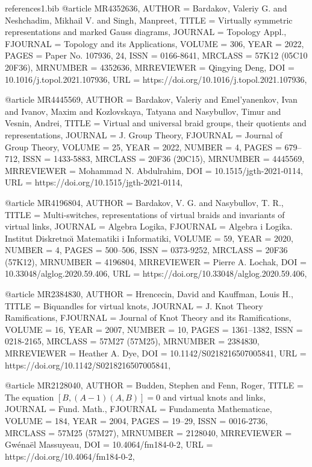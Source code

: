 \documentclass[11pt, reqno]{amsart}
\theoremstyle{definition}
\begin{document}
\begin{filecontents*}[overwrite]{references1.bib}
@article {MR4352636,
 AUTHOR = {Bardakov, Valeriy G. and Neshchadim, Mikhail V. and Singh,
  Manpreet},
 TITLE = {Virtually symmetric representations and marked {G}auss
  diagrams},
 JOURNAL = {Topology Appl.},
 FJOURNAL = {Topology and its Applications},
 VOLUME = {306},
 YEAR = {2022},
 PAGES = {Paper No. 107936, 24},
 ISSN = {0166-8641},
 MRCLASS = {57K12 (05C10 20F36)},
 MRNUMBER = {4352636},
 MRREVIEWER = {Qingying Deng},
 DOI = {10.1016/j.topol.2021.107936},
 URL = {https://doi.org/10.1016/j.topol.2021.107936},
}

@article {MR4445569,
 AUTHOR = {Bardakov, Valeriy and Emel'yanenkov, Ivan and Ivanov, Maxim
  and Kozlovskaya, Tatyana and Nasybullov, Timur and Vesnin,
  Andrei},
 TITLE = {Virtual and universal braid groups, their quotients and
  representations},
 JOURNAL = {J. Group Theory},
 FJOURNAL = {Journal of Group Theory},
 VOLUME = {25},
 YEAR = {2022},
 NUMBER = {4},
 PAGES = {679--712},
 ISSN = {1433-5883},
 MRCLASS = {20F36 (20C15)},
 MRNUMBER = {4445569},
 MRREVIEWER = {Mohammad N. Abdulrahim},
 DOI = {10.1515/jgth-2021-0114},
 URL = {https://doi.org/10.1515/jgth-2021-0114},
}

@article {MR4196804,
 AUTHOR = {Bardakov, V. G. and Nasybullov, T. R.},
 TITLE = {Multi-switches, representations of virtual braids and
  invariants of virtual links},
 JOURNAL = {Algebra Logika},
 FJOURNAL = {Algebra i Logika. Institut Diskretno\u{\i} Matematiki i
  Informatiki},
 VOLUME = {59},
 YEAR = {2020},
 NUMBER = {4},
 PAGES = {500--506},
 ISSN = {0373-9252},
 MRCLASS = {20F36 (57K12)},
 MRNUMBER = {4196804},
 MRREVIEWER = {Pierre A. Lochak},
 DOI = {10.33048/alglog.2020.59.406},
 URL = {https://doi.org/10.33048/alglog.2020.59.406},
}

@article {MR2384830,
    AUTHOR = {Hrencecin, David and Kauffman, Louis H.},
     TITLE = {Biquandles for virtual knots},
   JOURNAL = {J. Knot Theory Ramifications},
  FJOURNAL = {Journal of Knot Theory and its Ramifications},
    VOLUME = {16},
      YEAR = {2007},
    NUMBER = {10},
     PAGES = {1361--1382},
      ISSN = {0218-2165},
   MRCLASS = {57M27 (57M25)},
  MRNUMBER = {2384830},
MRREVIEWER = {Heather A. Dye},
       DOI = {10.1142/S0218216507005841},
       URL = {https://doi.org/10.1142/S0218216507005841},
}

@article {MR2128040,
 AUTHOR = {Budden, Stephen and Fenn, Roger},
 TITLE = {The equation {$[B,(A-1)(A,B)]=0$} and virtual knots and links},
 JOURNAL = {Fund. Math.},
 FJOURNAL = {Fundamenta Mathematicae},
 VOLUME = {184},
 YEAR = {2004},
 PAGES = {19--29},
 ISSN = {0016-2736},
 MRCLASS = {57M25 (57M27)},
 MRNUMBER = {2128040},
 MRREVIEWER = {Gw\'{e}na\"{e}l Massuyeau},
 DOI = {10.4064/fm184-0-2},
 URL = {https://doi.org/10.4064/fm184-0-2},
}


\end{filecontents*}
\end{document}
